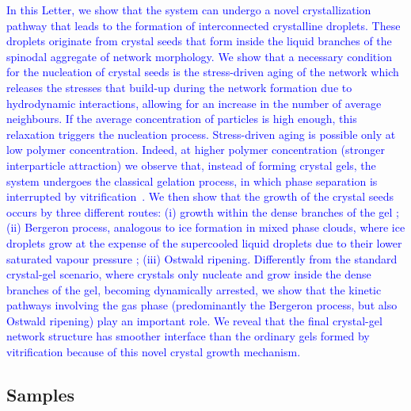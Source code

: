 \documentclass[preprint,amsmath,amssymb,superscriptaddress]{revtex4-1}
\begin{document}
\textcolor{blue}{
In this Letter, we show that the system can undergo a novel crystallization pathway that leads to the formation of interconnected crystalline droplets. 
These droplets originate from crystal seeds that form inside the liquid branches of the spinodal aggregate of network morphology.
We show that a necessary condition for the nucleation of crystal seeds is the stress-driven aging of the network which releases the stresses that build-up during the network formation due to hydrodynamic interactions, allowing for an increase in the number of average neighbours. 
If the average concentration of particles is high enough, this relaxation triggers the nucleation process. 
Stress-driven aging is possible only at low polymer concentration. 
Indeed, at higher polymer concentration (stronger interparticle attraction) we observe that, instead of forming crystal gels, the system undergoes the classical gelation process, in which
phase separation is interrupted by vitrification~\cite{verhaegh1997transient,tanaka1999colloid,Royall2007,lu2008gelation}.
We then show that the growth of the crystal seeds occurs by three different routes:
(i) growth within the dense branches of the gel ;
(ii) Bergeron process, analogous to ice formation in mixed phase clouds, where ice droplets grow at the
expense of the supercooled liquid droplets due to their lower saturated vapour pressure ;
(iii) Ostwald ripening.
Differently from the standard crystal-gel scenario, where crystals only nucleate and grow inside the dense branches of the gel, becoming dynamically arrested, we show that the kinetic pathways involving the gas phase (predominantly the Bergeron process, but also Ostwald ripening) play an important role.
We reveal that the final crystal-gel network structure has smoother interface than the ordinary gels formed by vitrification because of this novel crystal growth mechanism.
}

\subsection{Samples}
\end{document}
